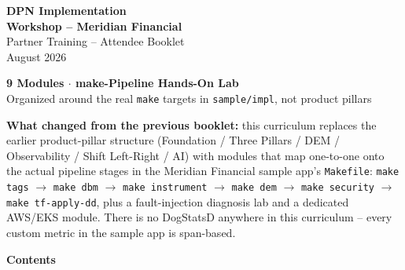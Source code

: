 \documentclass[10pt,a4paper]{article}
\begin{document}
\thispagestyle{empty}
\vspace*{2cm}
\begin{center}

{\fontsize{28}{34}\selectfont\bfseries\color{ddpurple}
DPN Implementation\\[6pt]
Workshop -- Meridian Financial}\\[1.2cm]

{\large\color{dddark} Partner Training -- Attendee Booklet}\\[0.4cm]
{\normalsize\color{ddgray} August 2026}\\[3cm]

\noindent\colorbox{ddpurple}{%
  \begin{minipage}{12cm}%
    \centering\vspace{10pt}
    {\large\bfseries\color{white}9 Modules $\cdot$ make-Pipeline Hands-On Lab}\\[6pt]
    {\normalsize\color{ddlightpurple}Organized around the real \texttt{make} targets in
    \texttt{sample/impl}, not product pillars}\\[10pt]
  \end{minipage}%
}

\end{center}
\vspace{2cm}

\textbf{\color{ddpurple}What changed from the previous booklet:} this curriculum replaces the
earlier product-pillar structure (Foundation / Three Pillars / DEM / Observability / Shift
Left-Right / AI) with modules that map one-to-one onto the actual pipeline stages in the
Meridian Financial sample app's \texttt{Makefile}: \texttt{make tags} $\rightarrow$
\texttt{make dbm} $\rightarrow$ \texttt{make instrument} $\rightarrow$ \texttt{make dem}
$\rightarrow$ \texttt{make security} $\rightarrow$ \texttt{make tf-apply-dd}, plus a
fault-injection diagnosis lab and a dedicated AWS/EKS module. There is no DogStatsD anywhere in
this curriculum -- every custom metric in the sample app is span-based.

\newpage

{\Large\bfseries\color{ddpurple}Contents}\par\vspace{8pt}
\makeatletter{}\makeatother
\newpage
\end{document}
